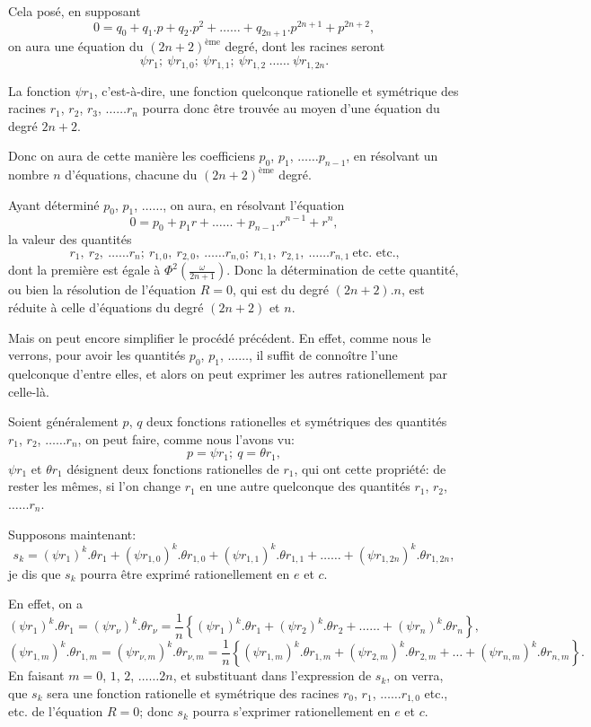 \documentclass{article}
\begin{document}
Cela posé, en supposant
\[ 0=q_{0}+q_{1}.p+q_{2}.p^{2}+\ldots\ldots+q_{2n+1}.p^{2n+1}+p^{2n+2}, \tag{104.} \]
on aura une équation du $(2n+2)^{\text{ème}}$ degré, dont les racines seront
\[ \psi r_{1};\ \psi r_{1,0};\ \psi r_{1,1};\ \psi r_{1,2}\ \ldots\ldots\ \psi r_{1,2n}. \]


La fonction $\psi r_{1}$, c'est-à-dire, une fonction quelconque rationelle et symétrique des racines $r_{1}$, $r_{2}$, $r_{3}$, $\ldots\ldots r_{n}$ pourra donc être trouvée au moyen d'une équation du degré $2n+2$.

Donc on aura de cette manière les coefficiens $p_{0}$, $p_{1}$, $\ldots\ldots p_{n-1}$, en résolvant un nombre $n$ d'équations, chacune du $(2n+2)^{\text{ème}}$ degré.

Ayant déterminé $p_{0}$, $p_{1}$, $\ldots\ldots$, on aura, en résolvant l'équation
\[ 0=p_{0}+p_{1}r+\ldots\ldots+p_{n-1}.r^{n-1}+r^{n}, \tag{105.} \]
la valeur des quantités
\[ r_{1},\ r_{2},\ \ldots\ldots r_{n};\ r_{1,0},\ r_{2,0},\ \ldots\ldots r_{n,0};\ r_{1,1},\ r_{2,1},\ \ldots\ldots r_{n,1}\ \text{etc. etc.,} \]
dont la première est égale à $\Phi^{2}\left(\frac{\omega}{2n+1}\right)$. Donc la détermination de cette quantité, ou bien la résolution de l'équation $R=0$, qui est du degré $(2n+2).n$, est réduite à celle d'équations du degré $(2n+2)$ et $n$.

Mais on peut encore simplifier le procédé précédent. En effet, comme nous le verrons, pour avoir les quantités $p_{0}$, $p_{1}$, $\ldots\ldots$, il suffit de connoître l'une quelconque d'entre elles, et alors on peut exprimer les autres rationellement par celle-là.

Soient généralement $p$, $q$ deux fonctions rationelles et symétriques des quantités $r_{1}$, $r_{2}$, $\ldots\ldots r_{n}$, on peut faire, comme nous l'avons vu:
\[ p=\psi r_{1};\ q=\theta r_{1}, \]
$\psi r_{1}$ et $\theta r_{1}$ désignent deux fonctions rationelles de $r_{1}$, qui ont cette propriété: de rester les mêmes, si l'on change $r_{1}$ en une autre quelconque des quantités $r_{1}$, $r_{2}$, $\ldots\ldots r_{n}$.

Supposons maintenant:
\[ s_{k}=(\psi r_{1})^{k}.\theta r_{1}+(\psi r_{1,0})^{k}.\theta r_{1,0}+(\psi r_{1,1})^{k}.\theta r_{1,1}+\ldots\ldots+(\psi r_{1,2n})^{k}.\theta r_{1,2n}, \]
je dis que $s_{k}$ pourra être exprimé rationellement en $e$ et $c$.

En effet, on a
\[ (\psi r_{1})^{k}.\theta r_{1}=(\psi r_{\nu})^{k}.\theta r_{\nu}=\frac{1}{n}\left\{(\psi r_{1})^{k}.\theta r_{1}+(\psi r_{2})^{k}.\theta r_{2}+\ldots\ldots+(\psi r_{n})^{k}.\theta r_{n}\right\}, \]
\[ (\psi r_{1,m})^{k}.\theta r_{1,m}=(\psi r_{\nu,m})^{k}.\theta r_{\nu,m}=\frac{1}{n}\left\{(\psi r_{1,m})^{k}.\theta r_{1,m}+(\psi r_{2,m})^{k}.\theta r_{2,m}+\ldots+(\psi r_{n,m})^{k}.\theta r_{n,m}\right\}. \]
En faisant $m=0$, $1$, $2$, $\ldots\ldots 2n$, et substituant dans l'expression de $s_{k}$, on verra, que $s_{k}$ sera une fonction rationelle et symétrique des racines $r_{0}$, $r_{1}$, $\ldots\ldots r_{1,0}$ etc., etc. de l'équation $R=0$; donc $s_{k}$ pourra s'exprimer rationellement en $e$ et $c$.
\end{document}
